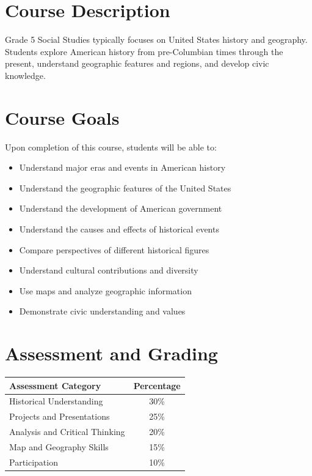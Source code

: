 \documentclass[11pt,letterpaper]{report}
\begin{document}
\section{Course Description}

Grade 5 Social Studies typically focuses on United States history and geography. Students explore American history from pre-Columbian times through the present, understand geographic features and regions, and develop civic knowledge.

\section{Course Goals}

Upon completion of this course, students will be able to:

\begin{itemize}
    \item Understand major eras and events in American history
    \item Understand the geographic features of the United States
    \item Understand the development of American government
    \item Understand the causes and effects of historical events
    \item Compare perspectives of different historical figures
    \item Understand cultural contributions and diversity
    \item Use maps and analyze geographic information
    \item Demonstrate civic understanding and values
\end{itemize}

\section{Assessment and Grading}

\begin{center}
\begin{tabular}{|l|c|}
\hline
\textbf{Assessment Category} & \textbf{Percentage} \\
\hline
Historical Understanding & 30\% \\
\hline
Projects and Presentations & 25\% \\
\hline
Analysis and Critical Thinking & 20\% \\
\hline
Map and Geography Skills & 15\% \\
\hline
Participation & 10\% \\
\hline
\end{tabular}
\end{center}
\end{document}
